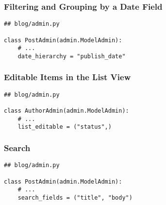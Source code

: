 \documentclass[aspectratio=169]{beamer}
\begin{document}
\begin{frame}[fragile]
\frametitle{Filtering and Grouping by a Date Field}

{\tiny
\begin{verbatim}
## blog/admin.py

class PostAdmin(admin.ModelAdmin):
    # ...
    date_hierarchy = "publish_date"
\end{verbatim}
}
\end{frame}


\begin{frame}
\begin{figure}[p]
  \centering
\end{figure}

\end{frame}




\begin{frame}[fragile]
\frametitle{Editable Items in the List View}

{\tiny
\begin{verbatim}
## blog/admin.py

class AuthorAdmin(admin.ModelAdmin):
    # ...
    list_editable = ("status",)
\end{verbatim}
}
\end{frame}


\begin{frame}
\begin{figure}[p]
  \centering
\end{figure}

\end{frame}


\begin{frame}[fragile]
\frametitle{Search}

{\tiny
\begin{verbatim}
## blog/admin.py

class PostAdmin(admin.ModelAdmin):
    # ...
    search_fields = ("title", "body")
\end{verbatim}
}
\end{frame}
\end{document}
